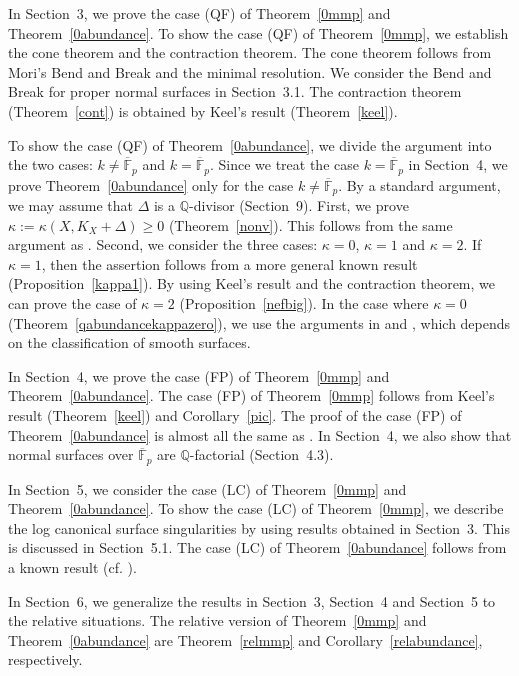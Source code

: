 \documentclass[12pt,twoside]{amsart}
\theoremstyle{definition}
\newcommand{\Q}{$\mathbb{Q}$}
\begin{document}
In Section~3, we prove the case (QF) of Theorem~\ref{0mmp} and Theorem~\ref{0abundance}. 
To show the case (QF) of Theorem~\ref{0mmp}, 
we establish the cone theorem and the contraction theorem. 
The cone theorem follows from Mori's Bend and Break and the minimal resolution. 
We consider the Bend and Break for proper normal surfaces in Section~3.1. 
The contraction theorem (Theorem~\ref{cont}) is obtained by Keel's result (Theorem~\ref{keel}). 

To show the case (QF) of Theorem~\ref{0abundance}, 
we divide the argument into the two cases: 
$k\neq \overline{\mathbb F}_p$ and $k=\overline{\mathbb F}_p$. 
Since we treat the case $k=\overline{\mathbb F}_p$ in Section~4, 
we prove Theorem~\ref{0abundance} only for the case $k\neq\overline{\mathbb F}_p$. 
By a standard argument, we may assume that $\Delta$ is a \Q-divisor (Section~9). 
First, we prove $\kappa:=\kappa(X, K_X+\Delta)\geq 0$ (Theorem~\ref{nonv}). 
This follows from the same argument as \cite{Fujino}. 
Second, we consider the three cases: $\kappa=0$, $\kappa=1$ and $\kappa=2$. 
If $\kappa=1$, then the assertion follows from a more general known result (Proposition~\ref{kappa1}). 
By using Keel's result and the contraction theorem, 
we can prove the case of $\kappa=2$ (Proposition~\ref{nefbig}). 
In the case where $\kappa=0$  (Theorem~\ref{qabundancekappazero}), 
we use the arguments in \cite{Fujino} and \cite{Fujita}, which depends on the classification of smooth surfaces. 

In Section~4, 
we prove the case (FP) of Theorem~\ref{0mmp} and Theorem~\ref{0abundance}. 
The case (FP) of Theorem~\ref{0mmp} follows from Keel's result (Theorem~\ref{keel}) and Corollary~\ref{pic}. 
The proof of the case (FP) of Theorem~\ref{0abundance} is almost all the same as \cite{Masek}. 
In Section~4, we also show that normal surfaces over $\overline{\mathbb F}_p$ are \Q-factorial (Section~4.3). 

In Section~5, 
we consider the case (LC) of 
Theorem~\ref{0mmp} and Theorem~\ref{0abundance}. 
To show the case (LC) of Theorem~\ref{0mmp}, 
we describe the log canonical surface singularities by using results obtained in Section~3. 
This is discussed in Section~5.1. 
The case (LC) of Theorem~\ref{0abundance} follows from a known result (cf. \cite{Fujita}). 


In Section~6, 
we generalize the results in Section~3, Section~4 and Section~5 to the relative situations. 
The relative version of Theorem~\ref{0mmp} and Theorem~\ref{0abundance} are 
Theorem~\ref{relmmp} and Corollary~\ref{relabundance}, respectively. 
\end{document}
